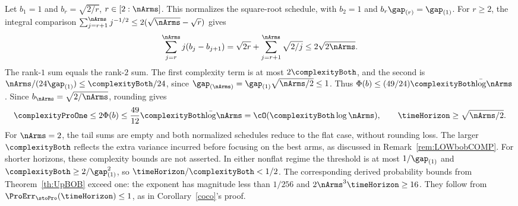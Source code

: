 \smallskip
\noindent
Let $b_1=1$ and $b_r=\sqrt{2/r}$, $r\in[2:\nArms]$.
This normalizes the square-root schedule, with $b_2=1$ and
$b_r\gap_{(r)}=\gap_{(1)}$.
For $r\geq2$, the integral comparison
$\sum_{j=r+1}^{\nArms}j^{-1/2}\leq2(\sqrt{\nArms}-\sqrt r)$ gives
\[
\sum_{j=r}^{\nArms}j(b_j-b_{j+1})
=\sqrt{2r}+\sum_{j=r+1}^{\nArms}\sqrt{2/j}
\leq2\sqrt{2\nArms}.
\]
The rank-$1$ sum equals the rank-$2$ sum. The first complexity term
is at most $2\complexityBoth$, and the second is
$\nArms/(24\gap_{(1)})\leq\complexityBoth/24$, since
$\gap_{(\nArms)}=\gap_{(1)}\sqrt{\nArms/2}\leq1$.
Thus $\Phi(b)\leq(49/24)\complexityBoth\bar\log\nArms$.
Since $b_{\nArms}=\sqrt{2/\nArms}$, rounding gives
\[
\complexityProOne\leq2\Phi(b)\leq\frac{49}{12}\complexityBoth\bar\log\nArms
=\cO(\complexityBoth\log\nArms),\qquad
\timeHorizon\geq\sqrt{\nArms/2}.
\]
For $\nArms=2$, the tail sums are empty and both normalized schedules
reduce to the flat case, without rounding loss.
The larger $\complexityBoth$ reflects the extra variance incurred before
focusing on the best arms, as discussed in Remark~\ref{rem:LOWbobCOMP}.
For shorter horizons, these complexity bounds are not asserted.
In either nonflat regime the threshold is at most $1/\gap_{(1)}$ and
$\complexityBoth\geq2/\gap_{(1)}^2$, so $\timeHorizon/\complexityBoth<1/2$.
The corresponding derived probability bounds from Theorem~\ref{th:UpBOB} exceed one:
the exponent has magnitude less than $1/256$ and
$2\nArms^3\timeHorizon\geq16$. They follow from
$\ProErr_{\stoPro}(\timeHorizon)\leq1$, as in Corollary~\ref{coco}'s proof.
